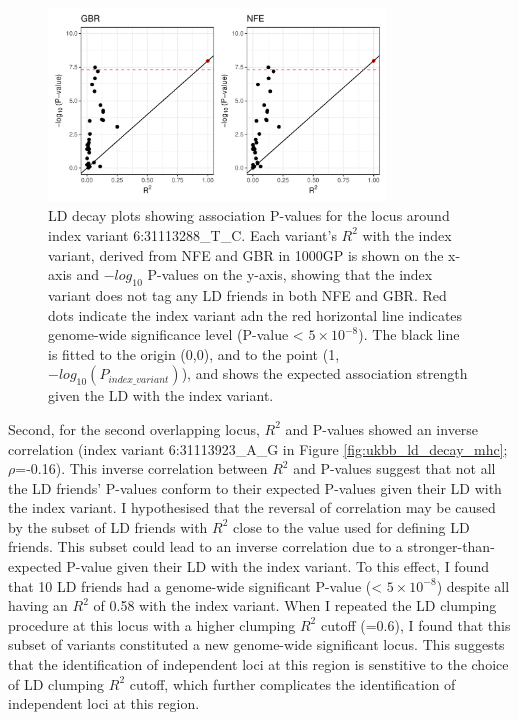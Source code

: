   \begin{figure}[H] 
    \centering    
    \includegraphics[width=0.8\textwidth]{ukbb_ld_decay_nfe_vs_gbr}
    \caption[Figure]{LD decay plots showing association P-values for the locus around index variant 6:31113288\_T\_C. Each variant's $R^{2}$ with the index variant, derived from NFE and GBR in 1000GP is shown on the x-axis and $-log_{10}$ P-values on the y-axis, showing that the index variant does not tag any LD friends in both NFE and GBR. Red dots indicate the index variant adn the red horizontal line indicates genome-wide significance level (P-value < $5\times10^{-8}$). The black line is fitted to the origin (0,0), and to the point (1,$-log_{10}(P_{index\_variant})$), and shows the expected association strength given the LD with the index variant.}
    \label{fig:ukbb_ld_decay_nfe_vs_gbr}
    \end{figure}

  Second, for the second overlapping locus, $R^{2}$ and P-values showed an inverse correlation (index variant 6:31113923\_A\_G in Figure \ref{fig:ukbb_ld_decay_mhc}; $\rho$=-0.16).  This inverse correlation between $R^{2}$ and P-values suggest that not all the LD friends' P-values conform to their expected P-values given their LD with the index variant. I hypothesised that the reversal of correlation may be caused by the subset of LD friends with $R^{2}$ close to the value used for defining LD friends. This subset could lead to an inverse correlation due to a stronger-than-expected P-value given their LD with the index variant. To this effect, I found that 10 LD friends had a genome-wide significant P-value (< $5\times10^{-8}$) despite all having an $R^{2}$ of 0.58 with the index variant. When I repeated the LD clumping procedure at this locus with a higher clumping $R^{2}$ cutoff (=0.6), I found that this subset of variants constituted a new genome-wide significant locus. This suggests that the identification of independent loci at this region is senstitive to the choice of LD clumping $R^{2}$ cutoff, which further complicates the identification of independent loci at this region. 
  

